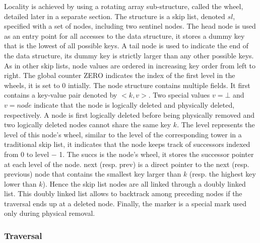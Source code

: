 \documentclass{article}
\begin{document}
Locality is achieved by using a rotating array sub-structure, called the wheel, detailed later in a separate section. The structure is a skip list, denoted $sl$, specified with a set of nodes, including two sentinel nodes. The head node is used as an entry point for all accesses to the data structure, it stores a dummy key that is the lowest of all possible keys. A tail node is used to indicate the end of the data structure, its dummy key is strictly larger than any other possible keys. As in other skip lists, node values are ordered in increasing key order from left to right. The global counter ZERO indicates the index of the first level in the wheels, it is set to 0 intially. The node structure contains multiple fields. It first contains a key-value pair denoted by $<k, v>$. Two special values $v = \bot$ and $v = node$ indicate that the node is logically deleted and physically deleted, respectively. A node is first logically deleted before being physically removed and two logically deleted nodes cannot share the same key $k$. The level represents the level of this node’s wheel, similar to the level of the corresponding tower in a traditional skip list, it indicates that the node keeps track of successors indexed from 0 to level − 1. The succs is the node’s wheel, it stores the successor pointer at each level of the node. next (resp. prev) is a direct pointer to the next (resp. previous) node that contains the smallest key larger than $k$ (resp. the highest key lower than $k$). Hence the skip list nodes are all linked through a doubly linked list. This doubly linked list allows to backtrack among preceding nodes if the traversal ends up at a deleted node. Finally, the marker is a special mark used only during physical removal. 

\subsubsection{Traversal}
\label{ssec:trv}
\end{document}
